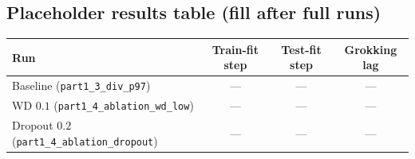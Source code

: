 \documentclass[11pt]{article}
\begin{document}
\subsection*{Placeholder results table (fill after full runs)}

\begin{center}
\begin{tabular}{@{}lccc@{}}
\toprule
Run & Train-fit step & Test-fit step & Grokking lag \\
\midrule
Baseline (\texttt{part1\_3\_div\_p97}) & --- & --- & --- \\
WD $0.1$ (\texttt{part1\_4\_ablation\_wd\_low}) & --- & --- & --- \\
Dropout $0.2$ (\texttt{part1\_4\_ablation\_dropout}) & --- & --- & --- \\
\bottomrule
\end{tabular}
\end{center}
\end{document}
